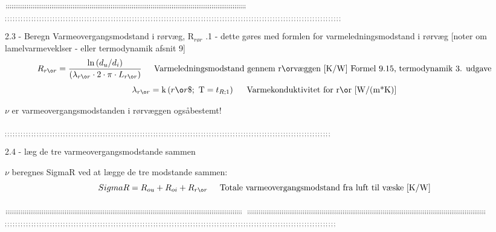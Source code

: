 \documentclass[../Hovedrapport.tex]{subfiles}
\newcommand{\F}[1]{\mbox{$#1$}}
\newcommand{\V}[1]{\mbox{$ #1 $}}
\newcommand{\I}{\mbox{\hspace{0.20in}}}
\newcommand{\conductivity}{\mathrm{k}}
\begin{document}
\vspace{0.10in}
\noindent
\rm $_{;;;;;;;;;;;;;;;;;;;;;;;;;;;;;;;;;;;;;;;;;;;;;;;;;;;;;;;;;;;;;;;;;;;;;;;;;;;;;;;;;;;;;;;;;;;;;;;;;;;;;;;;;;;;;;;;;;;;;;;;;;;;;;\newline}$
$_{;;;;;;;;;;;;;;;;;;;;;;;;;;;;;;;;;;;;;;;;;;;;;;;;;;;;;;;;;;;;;;;;;;;;;;;;;;;;;;;;;;;;;;;;;;;;;;;;;;;;;;;;;;;;;;;;;;;;;;;;;;;;;;;}$

\vspace{0.10in}
\noindent
\rm 2.3 - Beregn Varmeovergangsmodstand i rørvæg, R$_{rør}$\newline
 .1 - dette gøres med formlen for varmeledningsmodstand i rørvæg [noter om lamelvarmeveklser - eller termodynamik afsnit 9]
\begin{equation}
\label{EES Eqn:65}
R_{rør} = \frac {\ln{ \left( d_{u}/d_{i} \right) }}{  \left( \lambda_{rør} \cdot  2 \cdot  \pi \cdot  L_{rør} \right) 	 } 
\mbox{\I Varmeledningsmodstand gennem rørvæggen [K/W]	Formel 9.15, termodynamik 3. udgave}
\end{equation}
\begin{equation}
\label{EES Eqn:66}
\lambda_{rør} = \conductivity \left(\F{rør}\$;\mbox{\ T}=t_{R;1} \right)  	 
\mbox{\I Varmekonduktivitet for rør [W/(m*K)]}
\end{equation}

\vspace{0.10in}
\noindent
\rm $\nu$ er varmeovergangsmodstanden i rørvæggen ogs\aa bestemt!

\vspace{0.10in}
\noindent
\rm $_{;;;;;;;;;;;;;;;;;;;;;;;;;;;;;;;;;;;;;;;;;;;;;;;;;;;;;;;;;;;;;;;;;;;;;;;;;;;;;;;;;;;;;;;;;;;;;;;;;;;;;;;;;;;;;;;;;;;;;;;;;;;}$

\vspace{0.10in}
\noindent
\rm 2.4 - læg de tre varmeovergangsmodstande sammen

\vspace{0.10in}
\noindent
\rm $\nu$ beregnes SigmaR ved at lægge de tre modstande sammen:
\begin{equation}
\label{EES Eqn:67}
\V{SigmaR}  = R_{ou} + R_{oi} + R_{rør} 	 
\mbox{\I Totale varmeovergangsmodstand fra luft til væske [K/W]}
\end{equation}

\vspace{0.10in}
\noindent
\rm $_{;;;;;;;;;;;;;;;;;;;;;;;;;;;;;;;;;;;;;;;;;;;;;;;;;;;;;;;;;;;;;;;;;;;;;;;;;;;;;;;;;;;;;;;;;;;;;;;;;;;;;;;;;;;;;;;;;;;;;;;;;;;;\newline}$
$_{;;;;;;;;;;;;;;;;;;;;;;;;;;;;;;;;;;;;;;;;;;;;;;;;;;;;;;;;;;;;;;;;;;;;;;;;;;;;;;;;;;;;;;;;;;;;;;;;;;;;;;;;;;;;;;;;;;;;;;;;;;;;;\newline}$
$_{;;;;;;;;;;;;;;;;;;;;;;;;;;;;;;;;;;;;;;;;;;;;;;;;;;;;;;;;;;;;;;;;;;;;;;;;;;;;;;;;;;;;;;;;;;;;;;;;;;;;;;;;;;;;;;;;;;;;;;;;;;;;;}$
\end{document}
